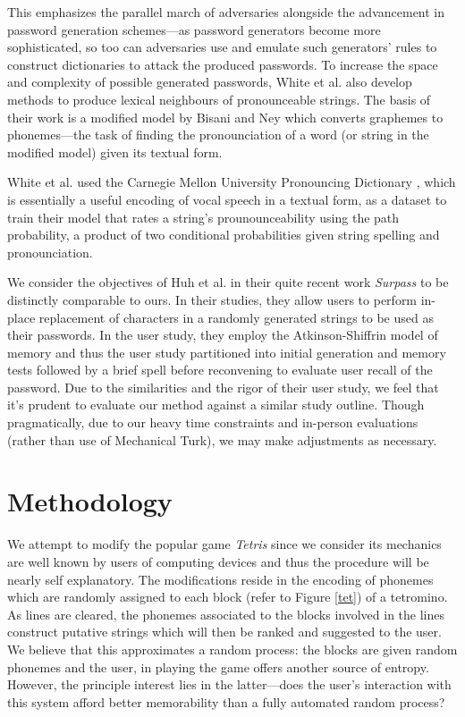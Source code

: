 \documentclass[conference]{IEEEtran}
\begin{document}
This emphasizes the parallel march of adversaries alongside the advancement in password generation schemes---as password generators become	more sophisticated, so too can adversaries use and emulate such generators' rules to construct dictionaries to attack the produced passwords. To increase the space and complexity of possible generated passwords, White et al. also develop methods to produce lexical neighbours of pronounceable strings. The basis of their work is a modified model by Bisani and Ney \cite{report:graph2phone} which converts graphemes to phonemes---the task of finding the pronounciation of a word (or string in the modified model) given its textual form. 

White et al. used the Carnegie Mellon University Pronouncing Dictionary \cite{report:CMUPD}, which is essentially a useful encoding of vocal speech in a textual form, as a dataset to train their model that rates a string's prounounceability using the path probability, a product of two conditional probabilities given string spelling and pronounciation.

We consider the objectives of Huh et al. \cite{report:surpass} in their quite recent work \emph{Surpass} to be distinctly comparable to ours. In their studies, they allow users to perform in-place replacement of characters in a randomly generated strings to be used as their passwords. In the user study, they employ the Atkinson-Shiffrin model of memory and thus the user study partitioned into initial generation and memory tests followed by a brief spell before reconvening to evaluate user recall of the password. Due to the similarities and the rigor of their user study, we feel that it's prudent to evaluate our method against a similar study outline. Though pragmatically, due to our heavy time constraints and in-person evaluations (rather than use of Mechanical Turk), we may make adjustments as necessary. 


\section{Methodology}
We attempt to modify the popular game \emph{Tetris} since we consider its mechanics are well known by users of computing devices and thus the procedure will be nearly self explanatory. The modifications reside in the encoding of phonemes which are randomly assigned to each block (refer to Figure \ref{tet}) of a tetromino. As lines are cleared, the phonemes associated to the blocks involved in the lines construct putative strings which will then be ranked and suggested to the user. We believe that this approximates a random process: the blocks are given random phonemes and the user, in playing the game offers another source of entropy. However, the principle interest lies in the latter---does the user's interaction with this system afford better memorability than a fully automated random process?
\end{document}

